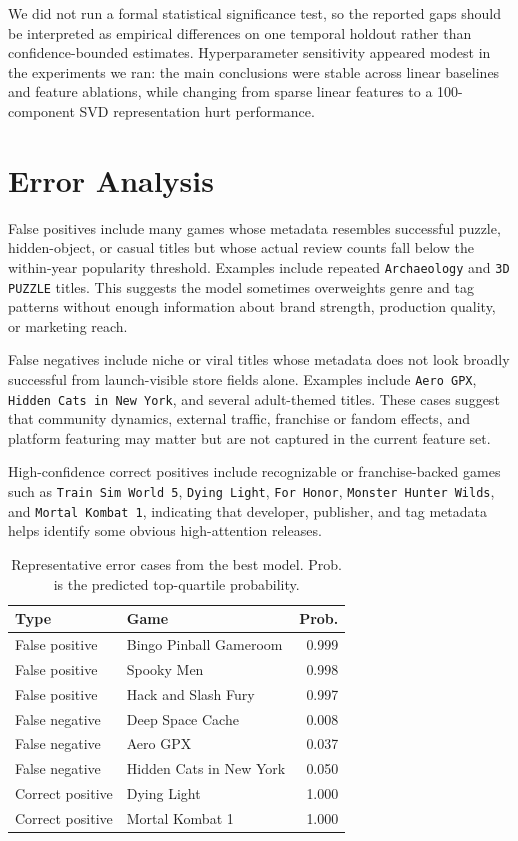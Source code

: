 \documentclass[11pt,sigconf,nonacm]{acmart}
\begin{document}
We did not run a formal statistical significance test, so the reported gaps should be interpreted as empirical differences on one temporal holdout rather than confidence-bounded estimates. Hyperparameter sensitivity appeared modest in the experiments we ran: the main conclusions were stable across linear baselines and feature ablations, while changing from sparse linear features to a 100-component SVD representation hurt performance.

\section{Error Analysis}

False positives include many games whose metadata resembles successful puzzle, hidden-object, or casual titles but whose actual review counts fall below the within-year popularity threshold. Examples include repeated \texttt{Archaeology} and \texttt{3D PUZZLE} titles. This suggests the model sometimes overweights genre and tag patterns without enough information about brand strength, production quality, or marketing reach.

False negatives include niche or viral titles whose metadata does not look broadly successful from launch-visible store fields alone. Examples include \texttt{Aero GPX}, \texttt{Hidden Cats in New York}, and several adult-themed titles. These cases suggest that community dynamics, external traffic, franchise or fandom effects, and platform featuring may matter but are not captured in the current feature set.

High-confidence correct positives include recognizable or franchise-backed games such as \texttt{Train Sim World 5}, \texttt{Dying Light}, \texttt{For Honor}, \texttt{Monster Hunter Wilds}, and \texttt{Mortal Kombat 1}, indicating that developer, publisher, and tag metadata helps identify some obvious high-attention releases.

\begin{table}[t]
\centering
\caption{Representative error cases from the best model. Prob. is the predicted top-quartile probability.}
\label{tab:errorcases}
\small
\setlength{\tabcolsep}{3pt}
\begin{tabular}{llr}
\toprule
Type & Game & Prob. \\
\midrule
False positive & Bingo Pinball Gameroom & 0.999 \\
False positive & Spooky Men & 0.998 \\
False positive & Hack and Slash Fury & 0.997 \\
False negative & Deep Space Cache & 0.008 \\
False negative & Aero GPX & 0.037 \\
False negative & Hidden Cats in New York & 0.050 \\
Correct positive & Dying Light & 1.000 \\
Correct positive & Mortal Kombat 1 & 1.000 \\
\bottomrule
\end{tabular}
\end{table}
\end{document}
